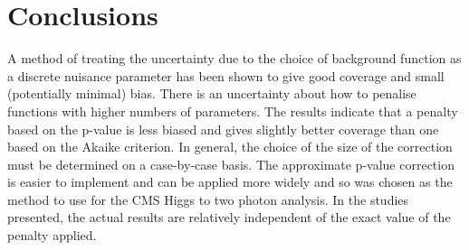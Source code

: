 \section{Conclusions} %
\label{sec:conclusions}

A method of treating the uncertainty due to the choice of background function
as a discrete nuisance parameter has been shown to give good coverage and
small (potentially minimal) bias.
There is an uncertainty about how to penalise functions with higher numbers
of parameters. The results indicate that a penalty based on the p-value
is less biased and gives slightly better coverage than one based on the
Akaike criterion. In general, the choice of the size of the correction must be determined
on a case-by-case basis. The approximate p-value correction is easier to implement and
can be applied more widely and so was chosen as the method to use for the CMS Higgs to 
two photon analysis.
In the studies presented, the actual results are relatively independent of the exact value of the penalty 
applied.



